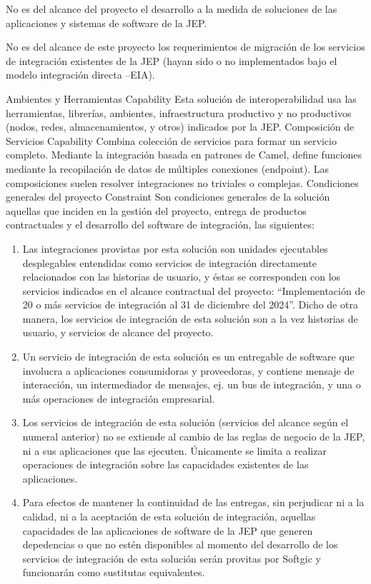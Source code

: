 \documentclass[
  paper=a4,
  ,captions=tableheading
]{scrartcl}
\providecommand{\tightlist}{%
  \setlength{\itemsep}{0pt}\setlength{\parskip}{0pt}}
\begin{document}
No es del alcance del proyecto el desarrollo a la medida de soluciones
de las aplicaciones y sistemas de software de la JEP.

No es del alcance de este proyecto los requerimientos de migración de
los servicios de integración existentes de la JEP (hayan sido o no
implementados bajo el modelo integración directa --EIA).

\textbar{} \textbar{} Ambientes y Herramientas \textbar{} Capability
\textbar{} Esta solución de interoperabilidad usa las herramientas,
librerías, ambientes, infraestructura productivo y no productivos
(nodos, redes, almacenamientos, y otros) indicados por la JEP.
\textbar{} \textbar{} Composición de Servicios \textbar{} Capability
\textbar{} Combina colección de servicios para formar un servicio
completo. Mediante la integración basada en patrones de Camel, define
funciones mediante la recopilación de datos de múltiples conexiones
(endpoint). Las composiciones suelen resolver integraciones no triviales
o complejas. \textbar{} \textbar{} Condiciones generales del proyecto
\textbar{} Constraint \textbar{} Son condiciones generales de la
solución aquellas que inciden en la gestión del proyecto, entrega de
productos contractuales y el desarrollo del software de integración, las
siguientes:

\begin{enumerate}
\def\labelenumi{\arabic{enumi}.}
\tightlist
\item
  Las integraciones provistas por esta solución son unidades ejecutables
  desplegables entendidas como servicios de integración directamente
  relacionados con las historias de usuario, y éstas se corresponden con
  los servicios indicados en el alcance contractual del proyecto:
  ``Implementación de 20 o más servicios de integración al 31 de
  diciembre del 2024''. Dicho de otra manera, los servicios de
  integración de esta solución son a la vez historias de usuario, y
  servicios de alcance del proyecto.
\item
  Un servicio de integración de esta solución es un entregable de
  software que involucra a aplicaciones consumidoras y proveedoras, y
  contiene mensaje de interacción, un intermediador de mensajes, ej. un
  bus de integración, y una o más operaciones de integración
  empresarial.
\item
  Los servicios de integración de esta solución (servicios del alcance
  según el numeral anterior) no se extiende al cambio de las reglas de
  negocio de la JEP, ni a sus aplicaciones que las ejecuten. Únicamente
  se limita a realizar operaciones de integración sobre las capacidades
  existentes de las aplicaciones.
\item
  Para efectos de mantener la continuidad de las entregas, sin
  perjudicar ni a la calidad, ni a la aceptación de esta solución de
  integración, aquellas capacidades de las aplicaciones de software de
  la JEP que generen depedencias o que no estén disponibles al momento
  del desarrollo de los servicios de integración de esta solución serán
  provitas por Softgic y funcionarán como sustitutas equivalentes.
\end{enumerate}
\end{document}
